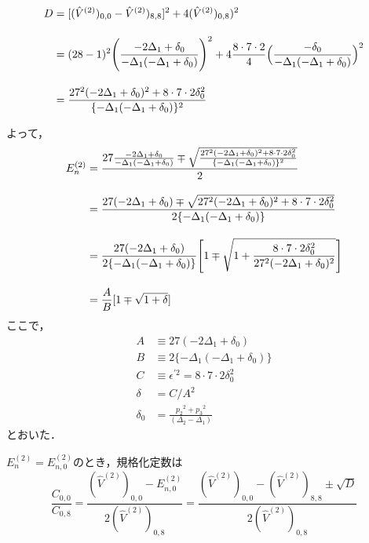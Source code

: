 \begin{align}
    D&=[(\hat{V}^{(2)})_{0,0} - \hat{V}^{(2)})_{8,8}]^2 + 4(\hat{V}^{(2)})_{0,8})^2\nn[10pt]
    &=(28-1)^2\Biggl(
    \frac{-2\Delta_1 + \delta_0}{-\Delta_1(-\Delta_1 + \delta_0)}
    \Biggr)^2
    +4\frac{8\cdot7\cdot2}{4}\Bigl(
    \frac{-\delta_0}
    {-\Delta_1(-\Delta_1 + \delta_0)}
    \Bigr)^2\nn[10pt]
    &=\frac{27^2(-2\Delta_1 + \delta_0)^2 + 8\cdot7\cdot2\delta_0^2}
    {\{-\Delta_1(-\Delta_1 + \delta_0)\}^2}
\end{align}

よって，
\begin{align}
    E^{(2)}_n&=\frac{
    27\frac{-2\Delta_1 + \delta_0}{-\Delta_1(-\Delta_1 + \delta_0)}
    \mp \sqrt{
    \frac{27^2(-2\Delta_1 + \delta_0)^2 + 8\cdot7\cdot2\delta_0^2}
    {\{-\Delta_1(-\Delta_1 + \delta_0)\}^2}
    }
    }{2}\nn[10pt]
    &=\frac{
    27(-2\Delta_1 + \delta_0)
    \mp \sqrt{
    27^2(-2\Delta_1 + \delta_0)^2 + 8\cdot7\cdot2\delta_0^2  
    }
    }{2\{-\Delta_1(-\Delta_1 + \delta_0)\}}\nn[10pt]
    &=\frac{
    27(-2\Delta_1 + \delta_0)}
    {2\{-\Delta_1(-\Delta_1 + \delta_0)\}}
    \Biggl[
    1\mp \sqrt{1+
    \frac{8\cdot7\cdot2\delta_0^2}{27^2(-2\Delta_1 + \delta_0)^2}  
    }
    \Biggr]
    \nn[10pt]
    &=\frac{A}{B}[1\mp\sqrt{1+\delta}]
\end{align}
ここで，
\begin{align}
    A&\equiv 27(-2\Delta_1 + \delta_0)\\[10pt]
    B&\equiv 2\{-\Delta_1(-\Delta_1 + \delta_0)\}\\[10pt]
    C&\equiv\epsilon^{\prime2}=8\cdot7\cdot2\delta_0^2\\[10pt]
    \delta&=C/A^2\\[10pt]
    \delta_0 &= \frac{{p_{2}}^2+{p_{3}}^2}{(\Delta_{2}-\Delta_{1})}
\end{align}
とおいた．

$E_n^{(2)}=E_{n,0}^{(2)}$のとき，規格化定数は
\begin{equation}
    \frac{C_{0,0}}{C_{0,8}} 
    = \frac{(\hat{V}^{(2)})_{0,0} - E_{n,0}^{(2)}}{2(\hat{V}^{(2)})_{0,8} }
    =  \frac{(\hat{V}^{(2)})_{0,0} - (\hat{V}^{(2)})_{8,8} \pm \sqrt{D}}
    {2(\hat{V}^{(2)})_{0,8} }
\end{equation}
\begin{align}
\end{align}





